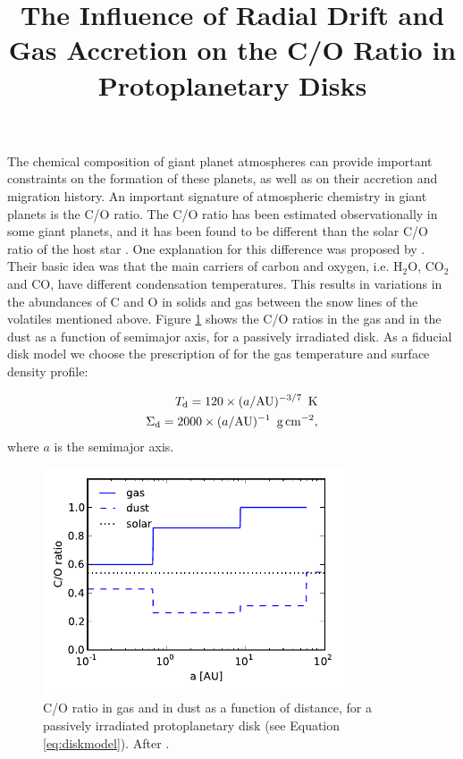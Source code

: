 \documentclass[12pt, preprint]{aastex}
\begin{document}


\title{The Influence of Radial Drift and Gas Accretion on the C/O Ratio in Protoplanetary Disks}

The chemical composition of giant planet atmospheres can provide important constraints on the formation of these planets, as well as on their accretion and migration history. An important signature of atmospheric chemistry in giant planets is the C/O ratio. The C/O ratio has been estimated observationally in some giant planets, and it has been found to be different than the solar C/O ratio of the host star \citep{madhu11}. One explanation for this difference was proposed by \citet{oberg11}. Their basic idea was that the main carriers of carbon and oxygen, i.e. H$_2$O, CO$_2$ and CO, have different condensation temperatures. This results in variations in the abundances of C and O in solids and gas between the snow lines of the volatiles mentioned above. Figure \ref{fig:CtoO} shows the C/O ratios in the gas and in the dust as a function of semimajor axis, for a passively irradiated disk. As a fiducial disk model we choose the prescription of \citet{chiang10} for the gas temperature and surface density profile:

\begin{eqnarray}
\label{eq:diskmodel}
T_{\rm d} = 120 \times (a/\rm AU)^{-3/7} \,\,\, \rm K \\
\Sigma_{\rm d} = 2000 \times (a/\rm AU)^{-1} \,\,\, \rm{g \, cm}^{-2},
\end{eqnarray}
where $a$ is the semimajor axis.


\begin{figure}[htb]
\centering
\includegraphics[width=0.8\textwidth]{../figs/C_O_ratio_2.pdf}
\caption{C/O ratio in gas and in dust as a function of distance, for a passively irradiated protoplanetary disk (see Equation \ref{eq:diskmodel}). After \citet{oberg11}.} %
\label{fig:CtoO}
\end{figure}
\end{document}
